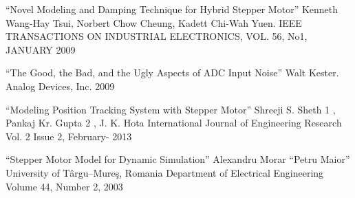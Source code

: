\begin{thebibliography}{30}
     ``Novel Modeling and Damping Technique for Hybrid Stepper Motor''
                                            Kenneth Wang-Hay Tsui, Norbert Chow Cheung, Kadett Chi-Wah Yuen.
                                            IEEE TRANSACTIONS ON INDUSTRIAL ELECTRONICS, VOL. 56, No1, JANUARY 2009

     ``The Good, the Bad, and the Ugly Aspects of ADC Input Noise''
                                        Walt Kester. Analog Devices, Inc. 2009

     ``Modeling Position Tracking System with Stepper Motor''
                                                Shreeji S. Sheth 1 , Pankaj Kr. Gupta 2 , J. K. Hota
                                                International Journal of Engineering Research
                                                Vol. 2 Issue 2, February- 2013

     ``Stepper Motor Model for Dynamic Simulation''
                                                            Alexandru Morar
                                                            “Petru Maior” University of Târgu–Mureş,
                                                            Romania Department of Electrical Engineering
                                                            Volume 44, Number 2, 2003

\end{thebibliography}

\endinput
